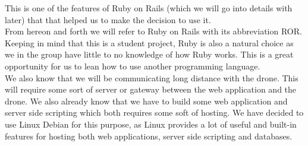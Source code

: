 This is one of the features of Ruby on Rails (which we will go into details with later) that that helped us to make the decision to use it. \\

From hereon and forth we will refer to Ruby on Rails with its abbreviation ROR. \\

Keeping in mind that this is a student project, Ruby is also a natural choice as we in the group have little to no knowledge of how Ruby works.
This is a great opportunity for us to lean how to use another programming language. \\

We also know that we will be communicating long distance with the drone.
This will require some sort of server or gateway between the web application and the drone.
We also already know that we have to build some web application and server side scripting which both requires some soft of hosting.
We have decided to use Linux Debian for this purpose, as Linux provides a lot of useful and built-in features for hosting both web applications, server side scripting and databases.

